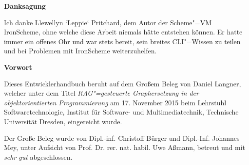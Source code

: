 

\cleardoublepage\thispagestyle{empty}
\begin{center}{\bfseries Danksagung}\end{center}
\begin{onehalfspace}
Ich danke Llewellyn `Leppie` Pritchard, dem Autor der Scheme"=VM IronScheme, ohne welche diese Arbeit niemals hätte entstehen können. Er hatte immer ein offenes Ohr und war stets bereit, sein breites CLI"=Wissen zu teilen und bei Problemen mit IronScheme weiterzuhelfen.
\end{onehalfspace}
\vfill\null

\cleardoublepage\thispagestyle{empty}
\begin{center}{\bfseries Vorwort}\end{center}
\begin{onehalfspace}
Dieses Entwicklerhandbuch beruht auf dem Gro{\ss}em Beleg von Daniel Langner, welcher unter dem Titel \emph{RAG"=gesteuerte Graphersetzung in der objektorientierten Programmierung} am 17. November 2015 beim Lehrstuhl Softwaretechnologie, Institut f{\"u}r Software- und Multimediatechnik, Technische Universit{\"a}t Dresden, eingereicht wurde.

\vspace{7pt}

Der Gro{\ss}e Beleg wurde von Dipl.-inf. Christoff B{\"u}rger und Dipl.-Inf. Johannes Mey, unter Aufsicht von Prof. Dr. rer. nat. habil. Uwe A{\ss}mann, betreut und mit \emph{sehr gut} abgeschlossen.
\end{onehalfspace}
\vfill\null
